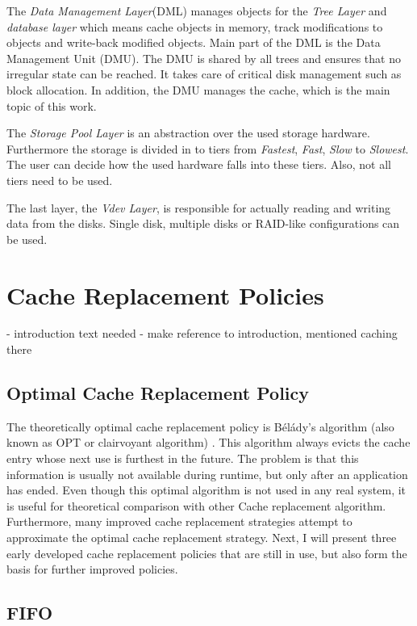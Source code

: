 \documentclass[
	12pt,
	a4paper,
	abstract,
	bibliography=totoc,
	chapterprefix,
	headings=openright,
	numbers=endperiod,
	parskip=half,
	twoside,
]{scrreprt}
\begin{document}
The \emph{Data Management Layer}(DML) manages objects for the \emph{Tree Layer} and \emph{database layer} which means cache objects in memory, 
track modifications to objects and write-back modified objects.
Main part of the DML is the Data Management Unit (DMU).
The DMU is shared by all trees and ensures that no irregular state can be reached.
It takes care of critical disk management such as block allocation.
In addition, the DMU manages the cache, which is the main topic of this work.

The \emph{Storage Pool Layer} is an abstraction over the used storage hardware.
Furthermore the storage is divided in to tiers from \emph{Fastest}, \emph{Fast}, \emph{Slow} to \emph{Slowest}.
The user can decide how the used hardware falls into these tiers. Also, not all tiers need to be used.

The last layer, the \emph{Vdev Layer}, is responsible for actually reading and writing data from the disks.
Single disk, multiple disks or RAID-like configurations can be used.

\section{Cache Replacement Policies}
\label{sec:cache replacement policies}

- introduction text needed
- make reference to introduction, mentioned caching there

\subsection{Optimal Cache Replacement Policy}
The theoretically optimal cache replacement policy is Bélády's algorithm (also known as OPT or clairvoyant algorithm) \cite{belady1966study}.
This algorithm always evicts the cache entry whose next use is furthest in the future.
The problem is that this information is usually not available during runtime, but only after an application has ended.
Even though this optimal algorithm is not used in any real system, it is useful for theoretical comparison with other 
Cache replacement algorithm.
Furthermore, many improved cache replacement strategies attempt to approximate the optimal cache replacement strategy.
Next, I will present three early developed cache replacement policies that are still in use, but also form the basis for further improved policies.


\subsection{FIFO}
\end{document}
